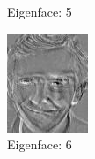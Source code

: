 \documentclass[12pt]{article}
\begin{document}
\begin{figure}
\begin{subfigure}[b]{0.20\textwidth}
		\caption{Eigenface: 5}
	\end{subfigure}\quad
	\begin{subfigure}[b]{0.20\textwidth}
		\includegraphics[width=\textwidth]{Task4.3_Images/PrincipalComponent6.jpg}
		\caption{Eigenface: 6}
	\end{subfigure}\quad
	\begin{subfigure}[b]{0.20\textwidth}

\end{subfigure}
\end{figure}
\end{document}
